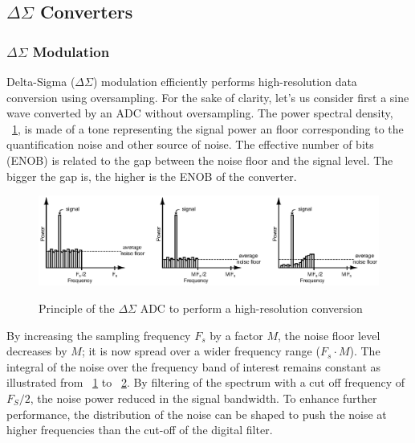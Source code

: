 \subsection{\(\Delta\Sigma \) Converters}      %
\label{sec:sd-isd-adc}
\subsubsection{\(\Delta\Sigma \) Modulation}
Delta-Sigma (\(\Delta\Sigma \)) modulation efficiently performs high-resolution data conversion using oversampling. For the sake of clarity, let's us consider first a sine wave converted by an ADC without oversampling. The power spectral density, \figurename~\ref{fig:spectrum-sine-nyquist}, is made of a tone representing the signal power an floor corresponding to the quantification noise and other source of noise. The effective number of bits (ENOB) is related to the gap between the noise floor and the signal level. The bigger the gap is, the higher is the ENOB of the converter.

\begin{figure}[htp]
	\centering
	\includegraphics[width=\textwidth]{Chapter2/Figs/Vector/sd-noise-shaping.ps}
	\begin{subfigure}[b]{0.33\textwidth}
		\label{fig:spectrum-sine-nyquist}
	\end{subfigure}
	\begin{subfigure}[b]{0.33\textwidth}
		\label{fig:spectrum-sine-oversampling}
	\end{subfigure}
	\begin{subfigure}[b]{0.33\textwidth}
	\end{subfigure}
	\caption{Principle of the $\Delta \Sigma$ ADC to perform a high-resolution conversion}
	\label{}
\end{figure}

By increasing the sampling frequency $F_s$ by a factor $M$, the noise floor level decreases by $M$; it is now spread over a wider frequency range ($F_s \cdot M$). The integral of the noise over the frequency band of interest remains constant as illustrated from \figurename~\ref{fig:spectrum-sine-nyquist} to \figurename~\ref{fig:spectrum-sine-oversampling}. By filtering of the spectrum with a cut off frequency of $F_S/2$, the noise power reduced in the signal bandwidth. To enhance further performance, the distribution of the noise can be shaped to push the noise at higher frequencies than the cut-off of the digital filter.

